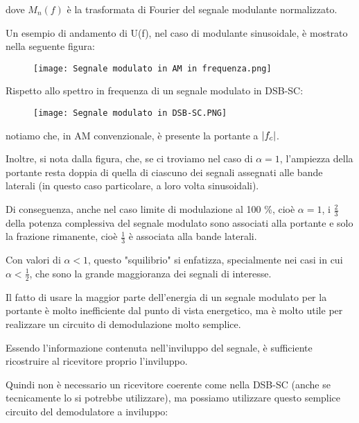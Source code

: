 dove $M_n (f)$ è la trasformata di Fourier del segnale modulante normalizzato. \newline 

\newpage 

Un esempio di andamento di U(f), nel caso di modulante sinusoidale, è mostrato nella seguente figura: 

\begin{figure}[h]
    \centering
    \texttt{[image: Segnale modulato in AM in frequenza.png]}
\end{figure} 

Rispetto allo spettro in frequenza di un segnale modulato in DSB-SC: 

\begin{figure}[h]
    \centering
    \texttt{[image: Segnale modulato in DSB-SC.PNG]}
\end{figure} 

notiamo che, in AM convenzionale, è presente la portante a $\abs{f_c}$. \newline

Inoltre, si nota dalla figura, che, se ci troviamo nel caso di $\alpha = 1$, 
l'ampiezza della portante resta doppia di quella di ciascuno dei segnali assegnati alle bande laterali (in questo caso particolare, a loro volta sinusoidali). \newline 

Di conseguenza, anche nel caso limite di modulazione al 100 \%, cioè $\alpha = 1$, 
i $\frac{2}{3}$ della potenza complessiva del segnale modulato sono associati alla portante 
e solo la frazione rimanente, cioè $\frac{1}{3}$ è associata alla bande laterali. \newline 

Con valori di $\alpha < 1$, questo "squilibrio" si enfatizza, specialmente nei casi in cui $\alpha < \frac{1}{2}$, 
che sono la grande maggioranza dei segnali di interesse. \newline 

Il fatto di usare la maggior parte dell'energia di un segnale modulato per la portante è molto inefficiente dal punto di vista energetico, 
ma è molto utile per realizzare un circuito di demodulazione molto semplice. \newline 

Essendo l'informazione contenuta nell'inviluppo del segnale, 
è sufficiente ricostruire al ricevitore proprio l'inviluppo. \newline 

Quindi non è necessario un ricevitore coerente come nella DSB-SC (anche se tecnicamente lo si potrebbe utilizzare), 
ma possiamo utilizzare questo semplice circuito del demodulatore a inviluppo: 

